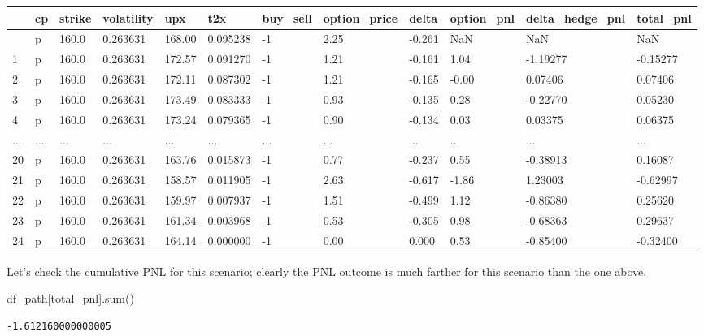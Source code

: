 \documentclass[
  letterpaper,
  DIV=11,
  numbers=noendperiod]{scrreprt}
\newenvironment{Shaded}{\begin{snugshade}}{\end{snugshade}}
\newcommand{\BuiltInTok}[1]{\textcolor[rgb]{0.00,0.23,0.31}{#1}}
\newcommand{\NormalTok}[1]{\textcolor[rgb]{0.00,0.23,0.31}{#1}}
\newcommand{\StringTok}[1]{\textcolor[rgb]{0.13,0.47,0.30}{#1}}
\begin{document}
\begin{longtable}[]{@{}llllllllllll@{}}
\toprule\noalign{}
& cp & strike & volatility & upx & t2x & buy\_sell & option\_price &
delta & option\_pnl & delta\_hedge\_pnl & total\_pnl \\
\midrule\noalign{}
\endhead
\bottomrule\noalign{}
\endlastfoot
0 & p & 160.0 & 0.263631 & 168.00 & 0.095238 & -1 & 2.25 & -0.261 & NaN
& NaN & NaN \\
1 & p & 160.0 & 0.263631 & 172.57 & 0.091270 & -1 & 1.21 & -0.161 & 1.04
& -1.19277 & -0.15277 \\
2 & p & 160.0 & 0.263631 & 172.11 & 0.087302 & -1 & 1.21 & -0.165 &
-0.00 & 0.07406 & 0.07406 \\
3 & p & 160.0 & 0.263631 & 173.49 & 0.083333 & -1 & 0.93 & -0.135 & 0.28
& -0.22770 & 0.05230 \\
4 & p & 160.0 & 0.263631 & 173.24 & 0.079365 & -1 & 0.90 & -0.134 & 0.03
& 0.03375 & 0.06375 \\
... & ... & ... & ... & ... & ... & ... & ... & ... & ... & ... & ... \\
20 & p & 160.0 & 0.263631 & 163.76 & 0.015873 & -1 & 0.77 & -0.237 &
0.55 & -0.38913 & 0.16087 \\
21 & p & 160.0 & 0.263631 & 158.57 & 0.011905 & -1 & 2.63 & -0.617 &
-1.86 & 1.23003 & -0.62997 \\
22 & p & 160.0 & 0.263631 & 159.97 & 0.007937 & -1 & 1.51 & -0.499 &
1.12 & -0.86380 & 0.25620 \\
23 & p & 160.0 & 0.263631 & 161.34 & 0.003968 & -1 & 0.53 & -0.305 &
0.98 & -0.68363 & 0.29637 \\
24 & p & 160.0 & 0.263631 & 164.14 & 0.000000 & -1 & 0.00 & 0.000 & 0.53
& -0.85400 & -0.32400 \\
\end{longtable}

Let's check the cumulative PNL for this scenario; clearly the PNL
outcome is much farther for this scenario than the one above.

\begin{Shaded}
\begin{Highlighting}[]
\NormalTok{df\_path[}\StringTok{\textquotesingle{}total\_pnl\textquotesingle{}}\NormalTok{].}\BuiltInTok{sum}\NormalTok{()}
\end{Highlighting}
\end{Shaded}

\begin{verbatim}
-1.612160000000005
\end{verbatim}
\end{document}
